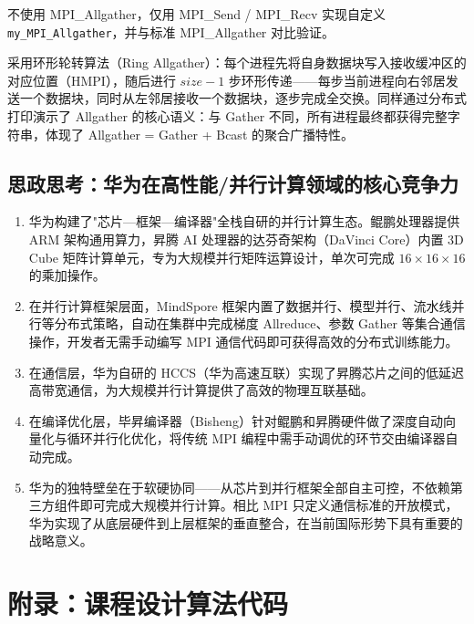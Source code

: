 \noindent 不使用 MPI\_Allgather，仅用 MPI\_Send / MPI\_Recv 实现自定义 \texttt{my\_MPI\_Allgather}，并与标准 MPI\_Allgather 对比验证。

采用环形轮转算法（Ring Allgather）：每个进程先将自身数据块写入接收缓冲区的对应位置（HMPI），随后进行 $size-1$ 步环形传递——每步当前进程向右邻居发送一个数据块，同时从左邻居接收一个数据块，逐步完成全交换。同样通过分布式打印演示了 Allgather 的核心语义：与 Gather 不同，所有进程最终都获得完整字符串，体现了 Allgather = Gather + Bcast 的聚合广播特性。



\clearpage
\subsection{思政思考：华为在高性能/并行计算领域的核心竞争力}

\begin{enumerate}
\item 华为构建了"芯片—框架—编译器"全栈自研的并行计算生态。鲲鹏处理器提供 ARM 架构通用算力，昇腾 AI 处理器的达芬奇架构（DaVinci Core）内置 3D Cube 矩阵计算单元，专为大规模并行矩阵运算设计，单次可完成 $16\times16\times16$ 的乘加操作。

\item 在并行计算框架层面，MindSpore 框架内置了数据并行、模型并行、流水线并行等分布式策略，自动在集群中完成梯度 Allreduce、参数 Gather 等集合通信操作，开发者无需手动编写 MPI 通信代码即可获得高效的分布式训练能力。

\item 在通信层，华为自研的 HCCS（华为高速互联）实现了昇腾芯片之间的低延迟高带宽通信，为大规模并行计算提供了高效的物理互联基础。

\item 在编译优化层，毕昇编译器（Bisheng）针对鲲鹏和昇腾硬件做了深度自动向量化与循环并行化优化，将传统 MPI 编程中需手动调优的环节交由编译器自动完成。

\item 华为的独特壁垒在于软硬协同——从芯片到并行框架全部自主可控，不依赖第三方组件即可完成大规模并行计算。相比 MPI 只定义通信标准的开放模式，华为实现了从底层硬件到上层框架的垂直整合，在当前国际形势下具有重要的战略意义。
\end{enumerate}

\clearpage
\section{附录：课程设计算法代码}

